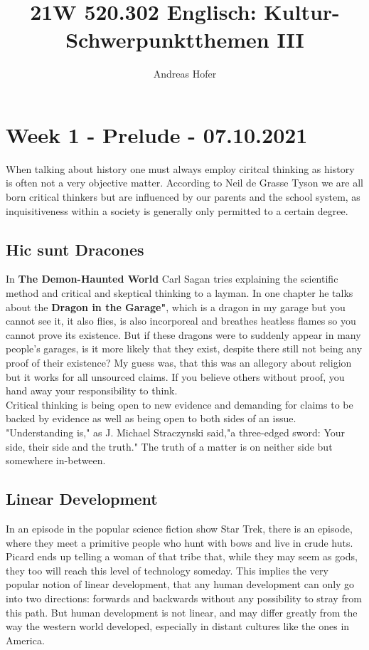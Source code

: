 \documentclass{article}
\title{21W 520.302 Englisch: Kultur-Schwerpunktthemen III}
\author{Andreas Hofer}
\begin{document}
	\maketitle

	\section{Week 1 - Prelude - 07.10.2021}

	When talking about history one must always employ ciritcal thinking as history is often not a very objective matter. According to Neil de Grasse Tyson we are all born critical thinkers but are influenced by our parents and the school system, as inquisitiveness within a society is generally only permitted to a certain degree. \\
	\subsection{Hic sunt Dracones}
	In \textbf{The Demon-Haunted World} Carl Sagan tries explaining the scientific method and critical and skeptical thinking to a layman. In one chapter he talks about the \textbf{Dragon in the Garage"}, which is a dragon in my garage but you cannot see it, it also flies, is also incorporeal and breathes heatless flames so you cannot prove its existence. But if these dragons were to suddenly appear in many people's garages, is it more likely that they exist, despite there still not being any proof of their existence? My guess was, that this was an allegory about religion but it works for all unsourced claims. If you believe others without proof, you hand away your responsibility to think. \\
	Critical thinking is being open to new evidence and demanding for claims to be backed by evidence as well as being open to both sides of an issue. "Understanding is," as J. Michael Straczynski said,"a three-edged sword: Your side, their side and the truth." The truth of a matter is on neither side but somewhere in-between. \\
	\subsection{Linear Development}
	In an episode in the popular science fiction show Star Trek, there is an episode, where they meet a primitive people who hunt with bows and live in crude huts. Picard ends up telling a woman of that tribe that, while they may seem as gods, they too will reach this level of technology someday. This implies the very popular notion of linear development, that any human development can only go into two directions: forwards and backwards without any possibility to stray from this path. But human development is not linear, and may differ greatly from the way the western world developed, especially in distant cultures like the ones in America. \\
	\newpage
\end{document}
